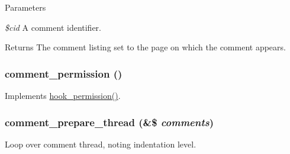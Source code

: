 \begin{DoxyParams}{Parameters}
\item[{\em \$cid}]A comment identifier. \end{DoxyParams}
\begin{DoxyReturn}{Returns}
The comment listing set to the page on which the comment appears. 
\end{DoxyReturn}
\hypertarget{comment_8module_a387b3124043febad12f7f0aff06a1443}{
\subsubsection[{comment\_\-permission}]{\setlength{\rightskip}{0pt plus 5cm}comment\_\-permission ()}}
\label{comment_8module_a387b3124043febad12f7f0aff06a1443}
Implements \hyperlink{group__hooks_ga2b22b45f4925f2478412477bae329713}{hook\_\-permission()}. \hypertarget{comment_8module_a8fca2690aec83615ca65cb9f7f3b9438}{
\subsubsection[{comment\_\-prepare\_\-thread}]{\setlength{\rightskip}{0pt plus 5cm}comment\_\-prepare\_\-thread (\&\$ {\em comments})}}
\label{comment_8module_a8fca2690aec83615ca65cb9f7f3b9438}
Loop over comment thread, noting indentation level.


